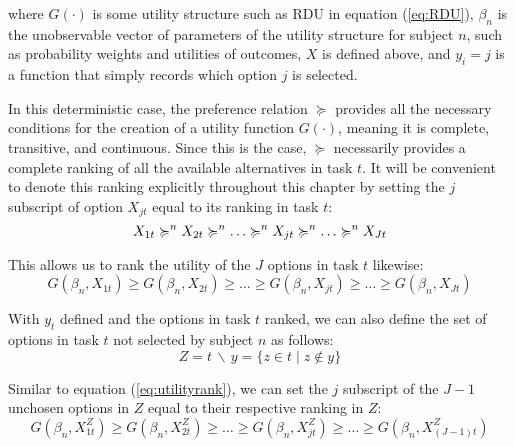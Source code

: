 \noindent where $G(\cdot)$ is some utility structure such as RDU in equation (\ref{eq:RDU}), $\beta_n$ is the unobservable vector of parameters of the utility structure for subject $n$, such as probability weights and utilities of outcomes, $X$ is defined above, and $y_i=j$ is a function that simply records which option $j$ is selected.

In this deterministic case, the preference relation $\succcurlyeq$ provides all the necessary conditions for the creation of a utility function $G(\cdot)$, meaning it is complete, transitive, and continuous.
Since this is the case, $\succcurlyeq$ necessarily provides a complete ranking of all the available alternatives in task $t$.
It will be convenient to denote this ranking explicitly throughout this chapter by setting the $j$ subscript of option $X_{jt}$ equal to its ranking in task $t$:
\begin{equation}
	\label{eq:outcomerank} 
	X_{1t} \succcurlyeq^n X_{2t} \succcurlyeq^n \ldots \succcurlyeq^n X_{jt} \succcurlyeq^n \ldots \succcurlyeq^n X_{Jt}\\
\end{equation}

\noindent This allows us to rank the utility of the $J$ options in task $t$ likewise:
\begin{equation}
	\label{eq:utilityrank}
	G(\beta_n,X_{1t}) \geq G(\beta_n,X_{2t}) \geq \ldots \geq G(\beta_n,X_{jt}) \geq \ldots \geq G(\beta_n,X_{Jt})
\end{equation}

With $y_t$ defined and the options in task $t$ ranked, we can also define the set of options in task $t$ not selected by subject $n$ as follows:
\begin{equation}
	\label{eq:emptyset}
	Z = t \,\backslash\, y = \{z \in t \;|\; z \notin y \}
\end{equation}

Similar to equation (\ref{eq:utilityrank}), we can set the $j$ subscript of the $J-1$ unchosen options in $Z$ equal to their respective ranking in $Z$:
\begin{equation}
	\label{eq:Zutilityrank}
	G(\beta_n,X_{1t}^Z) \geq G(\beta_n,X_{2t}^Z) \geq \ldots \geq G(\beta_n,X_{jt}^Z) \geq \ldots \geq G(\beta_n,X_{(J-1)t}^Z)
\end{equation}
 
